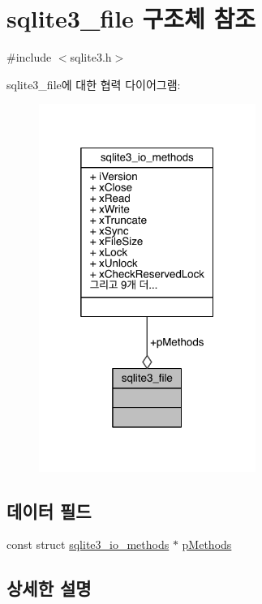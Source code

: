 \hypertarget{structsqlite3__file}{}\section{sqlite3\+\_\+file 구조체 참조}
\label{structsqlite3__file}


{\ttfamily \#include $<$sqlite3.\+h$>$}



sqlite3\+\_\+file에 대한 협력 다이어그램\+:
\nopagebreak
\begin{figure}[H]
\begin{center}
\leavevmode
\includegraphics[width=200pt]{d5/d54/structsqlite3__file__coll__graph}
\end{center}
\end{figure}
\subsection*{데이터 필드}
\begin{DoxyCompactItemize}
\item 
const struct \hyperlink{structsqlite3__io__methods}{sqlite3\+\_\+io\+\_\+methods} $\ast$ \hyperlink{structsqlite3__file_adfc58b2d7514112375d7330e2881bc70}{p\+Methods}
\end{DoxyCompactItemize}


\subsection{상세한 설명}


